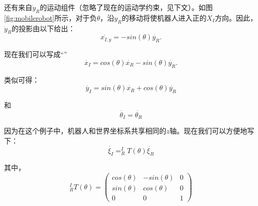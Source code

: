 
还有来自$\dot{y}_R$的运动组件（忽略了现在的运动学约束，见下文）。如图\ref{fig:mobilerobot}所示，对于负$\theta$，沿$y_R$的移动将使机器人进入正的$X_I$方向。因此，$\dot{y}_R$的投影由以下给出：
\begin{equation}
\dot{x_{I,y}}=-sin(\theta)\dot{y_R}.
\end{equation}

现在我们可以写成“”
\begin{equation}
\dot{x_I}=cos(\theta) \dot{x_R} - sin(\theta) \dot{y_R}.
\end{equation}

类似可得：
\begin{equation}
\dot{y_I}=sin(\theta) \dot{x_R} + cos(\theta) \dot{y_R}
\end{equation}

和
\begin{equation}
\dot{\theta_I}=\dot{\theta_R}
\end{equation}

因为在这个例子中，机器人和世界坐标系共享相同的$z$轴。现在我们可以方便地写下：
\begin{equation}
\dot{\xi_I}=^I_RT(\theta)\dot{\xi_R}
\end{equation}

其中，
\begin{equation}
^I_RT(\theta)=\left(\begin{array}{ccc}
cos(\theta) & -sin(\theta) & 0 \\
sin(\theta) & cos(\theta) & 0 \\
0 & 0 & 1\end{array}\right)
\end{equation}


